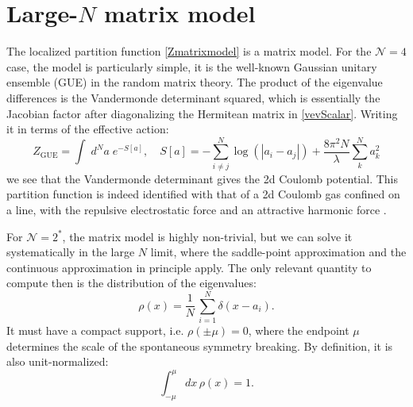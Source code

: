 \section{Large-$N$ matrix model}

The localized partition function \eqref{Zmatrixmodel} is a matrix model.
For the $\mathcal{N}=4$ case, the model is particularly simple, 
it is the well-known Gaussian unitary ensemble (GUE) in the random matrix theory.
The product of the eigenvalue differences is the Vandermonde determinant squared, 
which is essentially the Jacobian factor after diagonalizing the Hermitean matrix in \eqref{vevScalar}.
Writing it in terms of the effective action:
\begin{equation}\label{eq:ZGUE}
 Z_\text{GUE} = \int \; d^N a \;  e^{- S[a]}, 
 \quad S[a]=- \sum_{i\neq j}^N \log(|a_i-a_j|) + \frac{8\pi^2 N}{\lambda} \sum^N_k a_k^2
\end{equation}
we see that the Vandermonde determinant gives the 2d Coulomb potential.
This partition function is indeed identified with that of a 2d Coulomb gas confined on a line,
with the repulsive electrostatic force and an attractive harmonic force \cite{Dyson:1962es}.



For $\mathcal{N}=2^*$, the matrix model is highly non-trivial, 
but we can solve it systematically in the large $N$ limit,
where the saddle-point approximation and the continuous approximation in principle apply.
The only relevant quantity to compute then is the distribution of the eigenvalues:
\begin{equation} \label{def:rho}
\rho(x) = \dfrac{1}{N} \, \sum_{i=1}^N \delta(x-a_i) .
\end{equation}
It must have a compact support, i.e. $\rho(\pm \mu) = 0$,
where the endpoint $\mu$ determines the scale of the spontaneous symmetry breaking.
By definition, it is also unit-normalized:
\begin{equation}
 \int_{-\mu}^\mu dx\, \rho(x) = 1.
\end{equation}


